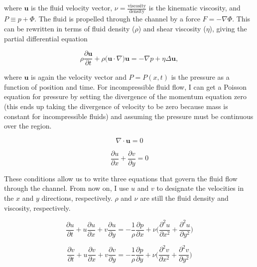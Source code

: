 \documentclass[11pt]{article}
\begin{document}
where \(\mathbf{u}\) is the fluid velocity vector,
\(\nu = \frac{\textrm{viscosity}}{\textrm{density}}\) is the kinematic
viscosity, and \(P \equiv p + \Phi.\) The fluid is propelled through the
channel by a force \(F = -\nabla\Phi.\) This can be rewritten in terms
of fluid density (\(\rho\)) and shear viscosity (\(\eta\)), giving the
partial differential equation

\begin{equation}
\rho\frac{\partial \mathbf{u}}{\partial t} + \rho\bigr(\mathbf{u} \cdot \nabla\bigr)\mathbf{u} = - \nabla p + \eta\Delta\mathbf{u},
\end{equation}

where \(\mathbf{u}\) is again the velocity vector and \(P = P(x,t)\) is
the pressure as a function of position and time. For incompressible
fluid flow, I can get a Poisson equation for pressure by setting the
divergence of the momentum equation zero (this ends up taking the
divergence of velocity to be zero because mass is constant for
incompressible fluids) and assuming the pressure must be continuous over
the region.

\begin{equation}
\nabla \cdot \mathbf{u} = 0
\end{equation}

\begin{equation}
\frac{\partial u}{\partial x} + \frac{\partial v}{\partial y} = 0
\end{equation}

These conditions allow us to write three equations that govern the fluid
flow through the channel. From now on, I use \(u\) and \(v\) to
designate the velocities in the \(x\) and \(y\) directions,
respectively. \(\rho\) and \(\nu\) are still the fluid density and
viscosity, respectively.

\begin{equation*}
\frac{\partial u}{\partial t} + u \frac{\partial u}{\partial x} + v\frac{\partial u}{\partial y} = -\frac 1\rho\frac{\partial p}{\partial x} + \nu\biggr(\frac{\partial^2 u}{\partial x^2} + \frac{\partial^2 u}{\partial y^2}\biggr)
\end{equation*}

\begin{equation*}
\frac{\partial v}{\partial t} + u \frac{\partial v}{\partial x} + v\frac{\partial v}{\partial y} = -\frac 1\rho\frac{\partial p}{\partial y} + \nu\biggr(\frac{\partial^2 v}{\partial x^2} + \frac{\partial^2 v}{\partial y^2}\biggr)
\end{equation*}
\end{document}
